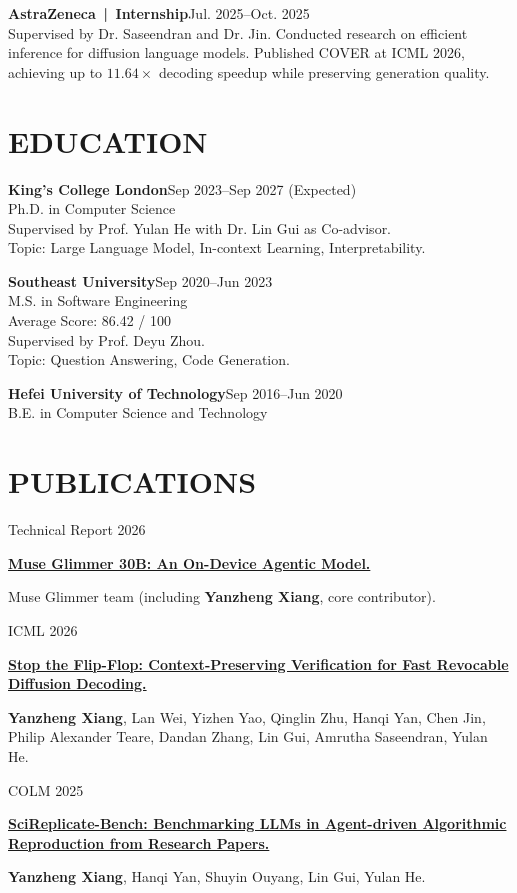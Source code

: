 \documentclass[UTF8,11pt,a4paper,fontset=none]{ctexart}
\newcommand{\pubentry}[4]{%
  \noindent
  \begin{minipage}[t]{0.19\textwidth}
    \vspace{0pt}\raggedright{\footnotesize\sffamily\color{muted}#1}
  \end{minipage}\hfill
  \begin{minipage}[t]{0.78\textwidth}
    \vspace{0pt}\raggedright
    {\small\bfseries\href{#4}{#3}}\par
    {\footnotesize\color{muted}#2}\par
  \end{minipage}\par\vspace{0.35em}%
}
\begin{document}
\textbf{AstraZeneca \,|\, Internship}\hfill Jul. 2025--Oct. 2025\\
Supervised by Dr. Saseendran and Dr. Jin. Conducted research on efficient inference for diffusion language models. Published COVER at ICML 2026, achieving up to $11.64\times$ decoding speedup while preserving generation quality.

\section*{EDUCATION}
\textbf{King's College London}\hfill Sep 2023--Sep 2027 (Expected)\\
Ph.D. in Computer Science\\
Supervised by Prof. Yulan He with Dr. Lin Gui as Co-advisor.\\
Topic: Large Language Model, In-context Learning, Interpretability.

\vspace{0.25em}
\textbf{Southeast University}\hfill Sep 2020--Jun 2023\\
M.S. in Software Engineering\\
Average Score: 86.42 / 100\\
Supervised by Prof. Deyu Zhou.\\
Topic: Question Answering, Code Generation.

\vspace{0.25em}
\textbf{Hefei University of Technology}\hfill Sep 2016--Jun 2020\\
B.E. in Computer Science and Technology

\section*{PUBLICATIONS}
\pubentry{Technical Report 2026}
  {Muse Glimmer team (including \textbf{Yanzheng Xiang}, core contributor).}
  {Muse Glimmer 30B: An On-Device Agentic Model.}
  {https://xyzcs.github.io/files/muse-glimmer-technical-report.pdf}

\pubentry{ICML 2026}
  {\textbf{Yanzheng Xiang}, Lan Wei, Yizhen Yao, Qinglin Zhu, Hanqi Yan, Chen Jin, Philip Alexander Teare, Dandan Zhang, Lin Gui, Amrutha Saseendran, Yulan He.}
  {Stop the Flip-Flop: Context-Preserving Verification for Fast Revocable Diffusion Decoding.}
  {https://arxiv.org/abs/2602.06161}

\pubentry{COLM 2025}
  {\textbf{Yanzheng Xiang}, Hanqi Yan, Shuyin Ouyang, Lin Gui, Yulan He.}
  {SciReplicate-Bench: Benchmarking LLMs in Agent-driven Algorithmic Reproduction from Research Papers.}
  {https://arxiv.org/abs/2504.00255}
\end{document}
